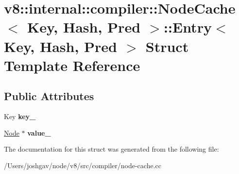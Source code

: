 \hypertarget{structv8_1_1internal_1_1compiler_1_1_node_cache_1_1_entry}{}\section{v8\+:\+:internal\+:\+:compiler\+:\+:Node\+Cache$<$ Key, Hash, Pred $>$\+:\+:Entry$<$ Key, Hash, Pred $>$ Struct Template Reference}
\label{structv8_1_1internal_1_1compiler_1_1_node_cache_1_1_entry}
\subsection*{Public Attributes}
\begin{DoxyCompactItemize}
\item 
Key {\bfseries key\+\_\+}\hypertarget{structv8_1_1internal_1_1compiler_1_1_node_cache_1_1_entry_a1ebe5b5a27ec142d7ca1df1e844ecc12}{}\label{structv8_1_1internal_1_1compiler_1_1_node_cache_1_1_entry_a1ebe5b5a27ec142d7ca1df1e844ecc12}

\item 
\hyperlink{classv8_1_1internal_1_1compiler_1_1_node}{Node} $\ast$ {\bfseries value\+\_\+}\hypertarget{structv8_1_1internal_1_1compiler_1_1_node_cache_1_1_entry_a9cd6a26d25cb0fc79edd933de4d1e815}{}\label{structv8_1_1internal_1_1compiler_1_1_node_cache_1_1_entry_a9cd6a26d25cb0fc79edd933de4d1e815}

\end{DoxyCompactItemize}


The documentation for this struct was generated from the following file\+:\begin{DoxyCompactItemize}
\item 
/\+Users/joshgav/node/v8/src/compiler/node-\/cache.\+cc\end{DoxyCompactItemize}
